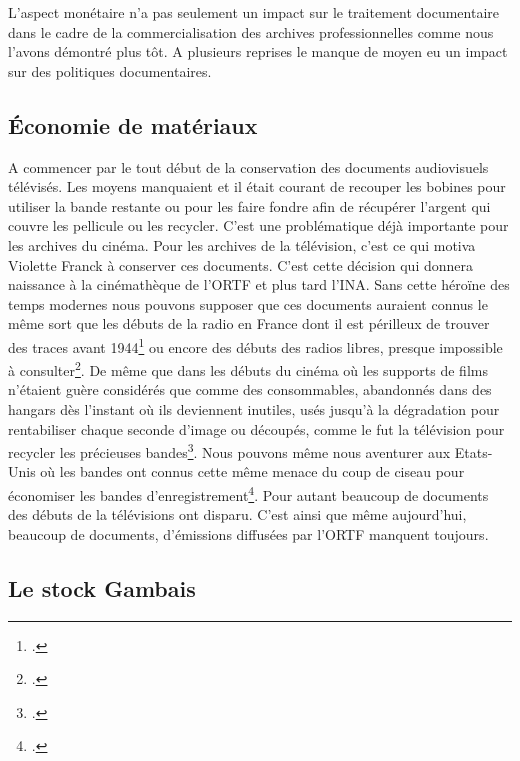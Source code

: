 
L'aspect monétaire n'a pas seulement un impact sur le traitement documentaire dans le cadre de la commercialisation des archives professionnelles comme nous l'avons démontré plus tôt. A plusieurs reprises le manque de moyen eu un impact sur des politiques documentaires. 

\subsection{Économie de matériaux}

A commencer par le tout début de la conservation des documents audiovisuels télévisés. Les moyens manquaient et il était courant de recouper les bobines pour utiliser la bande restante ou pour les faire fondre afin de récupérer l'argent qui couvre les pellicule ou les recycler. C’est une problématique déjà importante pour les archives du cinéma. Pour les archives de la télévision, c’est ce qui motiva Violette Franck à conserver ces documents. C’est cette décision qui donnera naissance à la cinémathèque de l'ORTF et plus tard l’INA. Sans cette héroïne des temps modernes nous pouvons supposer que ces documents auraient connus le même sort que les débuts de la radio en France dont il est périlleux de trouver des traces avant 1944\footcite[14]{jean-michel1986} ou encore des débuts des radios libres, presque impossible à consulter\footcite[16]{jean-michel1986}. De même que dans les débuts du cinéma où les supports de films n'étaient guère considérés que comme des consommables, abandonnés dans des hangars dès l'instant où ils deviennent inutiles, usés jusqu'à la dégradation pour rentabiliser chaque seconde d'image ou découpés, comme le fut la télévision pour recycler les précieuses bandes\footcite[][28]{olmeta2002}. Nous pouvons même nous aventurer aux Etats-Unis où les bandes ont connus cette même menace du coup de ciseau pour économiser les bandes d'enregistrement\footcite[17]{zotero-item-763}. Pour autant beaucoup de documents des débuts de la télévisions ont disparu. C'est ainsi que même aujourd'hui, beaucoup de documents, d'émissions diffusées par l'ORTF manquent toujours. 

\subsection{Le stock Gambais}

